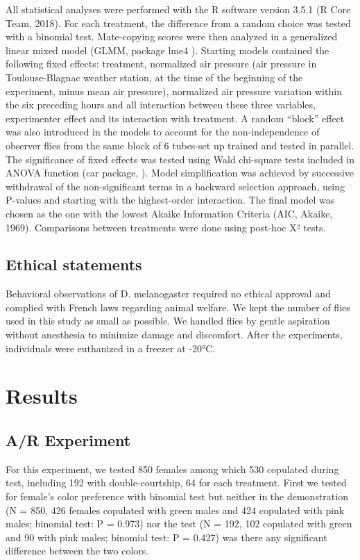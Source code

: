\documentclass[a4paper, 12pt]{article}
\begin{document}
	All statistical analyses were performed with the R software version 3.5.1 (R Core Team, 2018).
	For each treatment, the difference from a random choice was tested with a binomial test. Mate-copying scores were then analyzed in a generalized linear mixed model (GLMM, package lme4 \parencite{bates_fitting_2015}). Starting models contained the following fixed effects: treatment, normalized air pressure (air pressure in Toulouse-Blagnac weather station, at the time of the beginning of the experiment, minus mean air pressure), normalized air pressure variation within the six preceding hours and all interaction between these three variables, experimenter effect and its interaction with treatment. A random “block” effect was also introduced in the models to account for the non-independence of observer flies from the same block of 6 tubes-set up trained and tested in parallel. The significance of fixed effects was tested using Wald chi-square tests included in ANOVA function (car package, \textcite{fox_r_2018} ). Model simplification was achieved by successive withdrawal of the non-significant terms in a backward selection approach, using P-values and starting with the highest-order interaction. The final model was chosen as the one with the lowest Akaike Information Criteria (AIC, Akaike, 1969). Comparisons between treatments were done using post-hoc X² tests. 

	\subsection{Ethical statements}

	Behavioral observations of D. melanogaster required no ethical approval and complied with French laws regarding animal welfare. We kept the number of flies used in this study as small as possible. We handled flies by gentle aspiration without anesthesia to minimize damage and discomfort. After the experiments, individuals were euthanized in a freezer at -20°C.

	\section{Results}

	\subsection{A/R Experiment}
	\label{subsec:AR-experiment}

	For this experiment, we tested 850 females among which 530 copulated during test, including 192 with double-courtship, 64 for each treatment. First we tested for female's color preference with binomial test but neither in the demonstration (N = 850, 426 females copulated with green males and 424 copulated with pink males; binomial test: P = 0.973) nor the test (N = 192, 102 copulated with green and 90 with pink males; binomial test: P = 0.427) was there any significant difference between the two colors.
\end{document}
